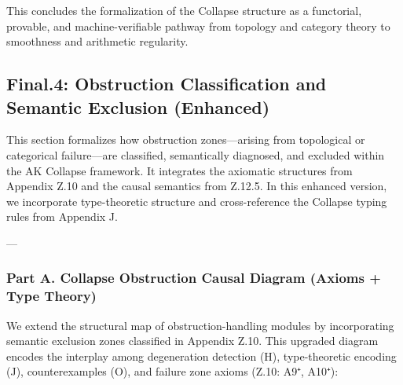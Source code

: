 \documentclass[11pt]{article}
\begin{document}
\begin{axiom}
\begin{axiom}
{{This concludes the formalization of the Collapse structure as a functorial, provable, and machine-verifiable pathway from topology and category theory to smoothness and arithmetic regularity.




\subsection*{Final.4: Obstruction Classification and Semantic Exclusion (Enhanced)}

This section formalizes how obstruction zones—arising from topological or categorical failure—are classified, semantically diagnosed,  
and excluded within the AK Collapse framework. It integrates the axiomatic structures from Appendix Z.10 and the causal semantics from Z.12.5.  
In this enhanced version, we incorporate type-theoretic structure and cross-reference the Collapse typing rules from Appendix J.

---

\subsubsection*{Part A. Collapse Obstruction Causal Diagram (Axioms + Type Theory)}

We extend the structural map of obstruction-handling modules by incorporating semantic exclusion zones classified in Appendix Z.10.  
This upgraded diagram encodes the interplay among degeneration detection (H), type-theoretic encoding (J), counterexamples (O),  
and failure zone axioms (Z.10: A9⁺, A10⁺):

\begin{center}
\end{center}

}}
\end{axiom}
\end{axiom}
\end{document}
